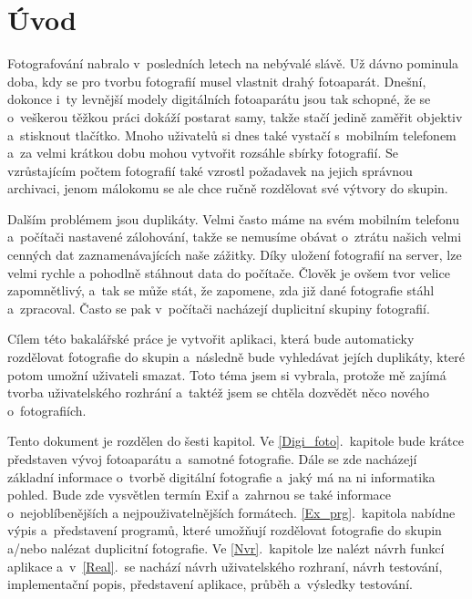 
\chapter{Úvod}
Fotografování nabralo v~posledních letech na nebývalé slávě. Už dávno pominula doba, kdy se pro tvorbu fotografií musel vlastnit drahý fotoaparát. Dnešní, dokonce i~ty levnější modely digitálních fotoaparátu jsou tak schopné, že se o~veškerou těžkou práci dokáží postarat samy, takže stačí jedině zaměřit objektiv a~stisknout tlačítko. Mnoho uživatelů si dnes také vystačí s~mobilním telefonem a~za velmi krátkou dobu mohou vytvořit rozsáhle sbírky fotografií. Se vzrůstajícím počtem fotografií také vzrostl požadavek na jejich správnou archivaci, jenom málokomu se ale chce ručně rozdělovat své výtvory do skupin.

Dalším problémem jsou duplikáty. Velmi často máme na svém mobilním telefonu a~počítači nastavené zálohování, takže se nemusíme obávat o~ztrátu našich velmi cenných dat zaznamenávajících naše zážitky. Díky uložení fotografií na server, lze velmi rychle a pohodlně stáhnout data do počítače. Člověk je ovšem tvor velice zapomnětlivý, a~tak se může stát, že zapomene, zda již dané fotografie stáhl a~zpracoval. Často se pak v~počítači nacházejí duplicitní skupiny fotografií.

Cílem této bakalářské práce je vytvořit aplikaci, která bude automaticky rozdělovat fotografie do skupin a~následně bude vyhledávat jejích duplikáty, které potom umožní uživateli smazat. Toto téma jsem si vybrala, protože mě zajímá tvorba uživatelského rozhrání a~taktéž jsem se chtěla dozvědět něco nového o~fotografiích.

Tento dokument je rozdělen do šesti kapitol. Ve \ref{Digi_foto}.~kapitole bude krátce představen vývoj fotoaparátu a~samotné fotografie. Dále se zde nacházejí základní informace o~tvorbě digitální fotografie a~jaký má na ni informatika pohled. Bude zde vysvětlen termín Exif a~zahrnou se také informace o~nejoblíbenějších a nejpouživatelnějších formátech. \ref{Ex_prg}.~kapitola nabídne výpis a~představení programů, které umožňují rozdělovat fotografie do skupin a/nebo nalézat duplicitní fotografie. Ve \ref{Nvr}.~kapitole lze nalézt návrh funkcí aplikace a~v~\ref{Real}.~se nachází návrh uživatelského rozhraní, návrh testování, implementační popis, představení aplikace, průběh a~výsledky testování. 


